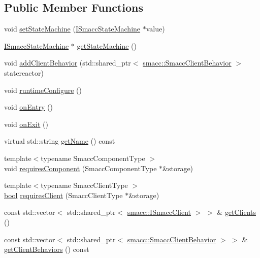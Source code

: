 \subsection*{Public Member Functions}
\begin{DoxyCompactItemize}
\item 
void \hyperlink{classsmacc_1_1ISmaccOrthogonal_a0fa0901a322f62a604c279c06d34f2f0}{set\+State\+Machine} (\hyperlink{classsmacc_1_1ISmaccStateMachine}{I\+Smacc\+State\+Machine} $\ast$value)
\item 
\hyperlink{classsmacc_1_1ISmaccStateMachine}{I\+Smacc\+State\+Machine} $\ast$ \hyperlink{classsmacc_1_1ISmaccOrthogonal_aae265ec480b8ed552ddc79afd2d93a62}{get\+State\+Machine} ()
\item 
void \hyperlink{classsmacc_1_1ISmaccOrthogonal_a17aaa112dfa2f9cee3782acc79430150}{add\+Client\+Behavior} (std\+::shared\+\_\+ptr$<$ \hyperlink{classsmacc_1_1SmaccClientBehavior}{smacc\+::\+Smacc\+Client\+Behavior} $>$ statereactor)
\item 
void \hyperlink{classsmacc_1_1ISmaccOrthogonal_a47ae4af0f05ea31cc98b4e1d792d1126}{runtime\+Configure} ()
\item 
void \hyperlink{classsmacc_1_1ISmaccOrthogonal_a35f4d2955445dc1a4b2dafbca2f0bd16}{on\+Entry} ()
\item 
void \hyperlink{classsmacc_1_1ISmaccOrthogonal_af7c30055b3cef6f65a83ae412ab34143}{on\+Exit} ()
\item 
virtual std\+::string \hyperlink{classsmacc_1_1ISmaccOrthogonal_a5700505608dcfc30cd613b546076d85f}{get\+Name} () const 
\item 
{\footnotesize template$<$typename Smacc\+Component\+Type $>$ }\\void \hyperlink{classsmacc_1_1ISmaccOrthogonal_a3f66cf4680e3026a6789769c8ea1aa83}{requires\+Component} (Smacc\+Component\+Type $\ast$\&storage)
\item 
{\footnotesize template$<$typename Smacc\+Client\+Type $>$ }\\\hyperlink{classbool}{bool} \hyperlink{classsmacc_1_1ISmaccOrthogonal_a602e16b09f8a1b3de889f2f3d90a3211}{requires\+Client} (Smacc\+Client\+Type $\ast$\&storage)
\item 
const std\+::vector$<$ std\+::shared\+\_\+ptr$<$ \hyperlink{classsmacc_1_1ISmaccClient}{smacc\+::\+I\+Smacc\+Client} $>$ $>$ \& \hyperlink{classsmacc_1_1ISmaccOrthogonal_a83f1d5390ec41d91566e6f034b25b7d9}{get\+Clients} ()
\item 
const std\+::vector$<$ std\+::shared\+\_\+ptr$<$ \hyperlink{classsmacc_1_1SmaccClientBehavior}{smacc\+::\+Smacc\+Client\+Behavior} $>$ $>$ \& \hyperlink{classsmacc_1_1ISmaccOrthogonal_abc321ac6a7e6fb620dcb087d61f49176}{get\+Client\+Behaviors} () const 

\end{DoxyCompactItemize}
